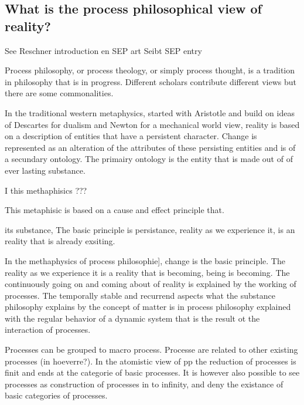 \subsection{What is the process philosophical view of reality?}


See Reschner introduction en SEP art \cite{Rescher-2012-sep}
Seibt SEP entry \cite{Seibt-2013-sep}


Process philosophy, or process theology, or simply process thought, is a tradition in philosophy that is in progress. Different scholars contribute different views but there are some commonalities.

In the traditional western metaphysics, started with Aristotle and build on ideas of Descartes for dualism and Newton for a mechanical world view, reality is based on a description of entities that have a persistent character. Change is represented as an alteration of the attributes of these persisting entities and is of a secundary ontology. The primairy ontology is the entity that is made out of of ever lasting substance.

I this methaphisics ???


This metaphisic is based on a cause and effect principle that.

its substance, The basic principle is persistance, reality as we experience it, is an reality that is already exsiting.

In the methaphysics of process philosophie], change is the basic principle. The reality as we experience it is a reality that is becoming, being is becoming.
The continuously going on and coming about of reality is explained by the working of processes. The temporally stable and recurrend aspects what the substance philosophy explains by the concept of matter is in process philosophy explained with the regular behavior of a dynamic system that is the result ot the interaction of processes.

Processes can be grouped to macro process. Processe are related to other existing processes (in hoeverre?).
In the atomistic view of pp the reduction of processes is finit and ends at the categorie of basic processes. It is however also possible to see processes as construction of processes in to infinity, and deny the existance of basic categories of processes.

